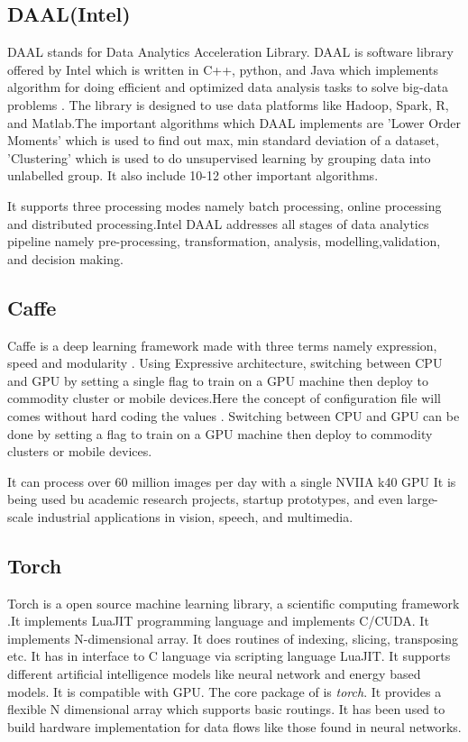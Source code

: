 \subsection{DAAL(Intel)}

    DAAL stands for Data Analytics Acceleration Library. DAAL is
    software library offered by Intel which is written in C++, python,
    and Java which implements algorithm for doing efficient and
    optimized data analysis tasks to solve big-data
    problems \cite{www-daal-wiki}. The library is designed to use
    data platforms like Hadoop, Spark, R, and Matlab.The important
    algorithms which DAAL implements are 'Lower Order Moments' which
    is used to find out max, min standard deviation of a dataset,
    'Clustering' which is used to do unsupervised learning by grouping
    data into unlabelled group. It also include 10-12 other important
    algorithms.

    \cite{www-daal-official} It supports three processing modes
    namely batch processing, online processing and distributed
    processing.Intel DAAL addresses all stages of data analytics
    pipeline namely pre-processing, transformation, analysis,
    modelling,validation, and decision making.
    
    
\subsection{Caffe}

    Caffe is a deep learning framework made with three terms namely
    expression, speed and modularity \cite{www-caffe}. Using
    Expressive architecture, switching between CPU and GPU by setting
    a single flag to train on a GPU machine then deploy to commodity
    cluster or mobile devices.Here the concept of configuration file
    will comes without hard coding the values . Switching between CPU
    and GPU can be done by setting a flag to train on a GPU machine
    then deploy to commodity clusters or mobile devices.

    It can process over 60 million images per day with a single NVIIA
    k40 GPU It is being used bu academic research projects, startup
    prototypes, and even large-scale industrial applications in
    vision, speech, and multimedia.
    
\subsection{Torch}

    Torch is a open source machine learning library, a scientific
    computing framework \cite{www-torch} .It implements LuaJIT
    programming language and implements C/CUDA. It implements
    N-dimensional array. It does routines of indexing, slicing,
    transposing etc. It has in interface to C language via scripting
    language LuaJIT. It supports different artificial intelligence
    models like neural network and energy based models. It is
    compatible with GPU.  The core package of is {\em torch}. It provides
    a flexible N dimensional array which supports basic routings. It
    has been used to build hardware implementation for data flows like
    those found in neural networks.
    
